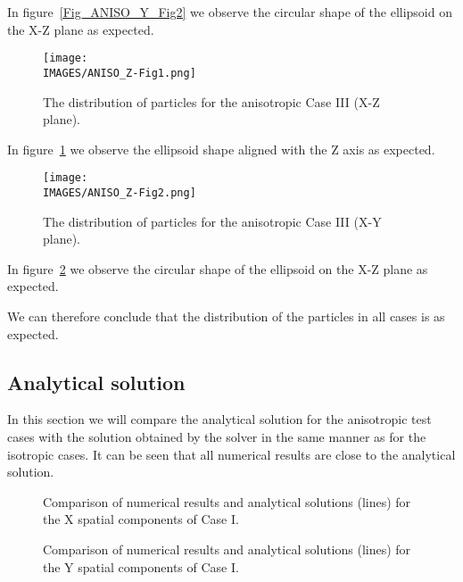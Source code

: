 In figure~\ref{Fig_ANISO_Y_Fig2} we observe the circular shape of the ellipsoid on the X-Z plane as expected.

\begin{figure}[H]
    \centering
    \texttt{[image: \\IMAGES/ANISO\_Z-Fig1.png]}
    \caption{The distribution of particles for the anisotropic Case III (X-Z plane).}
    \label{Fig_ANISO_Z_Fig1}
\end{figure}

In figure~\ref{Fig_ANISO_Z_Fig1} we observe the ellipsoid shape aligned with the Z axis as expected.

\begin{figure}[H]
    \centering
    \texttt{[image: \\IMAGES/ANISO\_Z-Fig2.png]}
    \caption{The distribution of particles for the anisotropic Case III (X-Y plane).}
    \label{Fig_ANISO_Z_Fig2}
\end{figure}

In figure~\ref{Fig_ANISO_Z_Fig2} we observe the circular shape of the ellipsoid on the X-Z plane as expected.

We can therefore conclude that the distribution of the particles in all cases is as expected.

\subsection{Analytical solution}
In this section we will compare the analytical solution for the anisotropic test cases with the solution obtained by the solver in the same manner as for the isotropic cases. It can be seen that all numerical results are close to the analytical solution.

\begin{figure}[H]
    \centering
    \caption{Comparison of numerical results and analytical solutions (lines) for the X spatial components of Case I.}
    \label{Fig_NUM_SCHEME_CASE_1X}
\end{figure}

\begin{figure}[H]
    \centering
    \caption{Comparison of numerical results and analytical solutions (lines) for the Y spatial components of Case I.}
    \label{Fig_NUM_SCHEME_CASE_1Y}
\end{figure}

